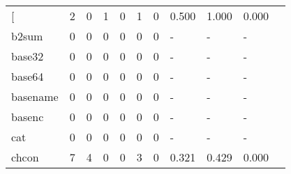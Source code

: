 \begin{longtable}{lp{1.10cm}p{1.10cm}p{1.10cm}p{1.10cm}p{1.10cm}p{1.10cm}p{1.10cm}p{1.10cm}p{1.10cm}p{1.10cm}}
\bottomrule
\endlastfoot
{[}         &                      2 &                                  0 &                                 1 &                                0 &                                 1 &                               0 &                          0.500 &                                 1.000 &                               0.000 \\
b2sum     &                      0 &                                  0 &                                 0 &                                0 &                                 0 &                               0 &                              - &                                     - &                                   - \\
base32    &                      0 &                                  0 &                                 0 &                                0 &                                 0 &                               0 &                              - &                                     - &                                   - \\
base64    &                      0 &                                  0 &                                 0 &                                0 &                                 0 &                               0 &                              - &                                     - &                                   - \\
basename  &                      0 &                                  0 &                                 0 &                                0 &                                 0 &                               0 &                              - &                                     - &                                   - \\
basenc    &                      0 &                                  0 &                                 0 &                                0 &                                 0 &                               0 &                              - &                                     - &                                   - \\
cat       &                      0 &                                  0 &                                 0 &                                0 &                                 0 &                               0 &                              - &                                     - &                                   - \\
chcon     &                      7 &                                  4 &                                 0 &                                0 &                                 3 &                               0 &                          0.321 &                                 0.429 &                               0.000 \\

\end{longtable}
